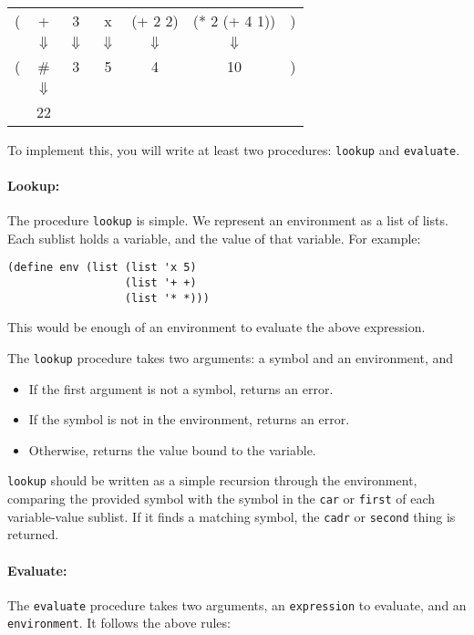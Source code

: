 \documentclass[letterpaper,12pt]{article}
\begin{document}
\begin{multicols}{2}
\begin{enumerate}
  {\hspace{-\leftmargin}
    \footnotesize \tt 
    \begin{tabular}{c@{}c@{\;}c@{\;}c@{\;}c@{\;}c@{}c}
      ( & + & 3 & x & (+ 2 2) & (* 2 (+ 4 1)) & )\\
        & $\Downarrow$& $\Downarrow$& $\Downarrow$& $\Downarrow$& $\Downarrow$& \\
      ( & \#<procedure:+> & 3 & 5 & 4 & 10 & )\\
        &$\Downarrow$ \\
        &22\\
    \end{tabular}
  }
  
\end{enumerate}

To implement this, you will write at least two procedures: {\tt lookup} and
{\tt evaluate}.

\paragraph{Lookup:}
The procedure {\tt lookup} is simple.  We represent an environment as a list of
lists.  Each sublist holds a variable, and the value of that variable. For
example:
\begin{Verbatim}[frame=single]
(define env (list (list 'x 5)
                  (list '+ +)
                  (list '* *)))
\end{Verbatim}
This would be enough of an environment to evaluate the above expression.

The {\tt lookup} procedure takes two arguments: a symbol and an environment, and
\begin{itemize}\setlength{\itemsep}{0pt}
\item If the first argument is not a symbol, returns an error.
\item If the symbol is not in the environment, returns an error.
\item Otherwise, returns the value bound to the variable.
\end{itemize}
{\tt lookup} should be written as a simple recursion through the
environment, comparing the provided symbol with the symbol in the
{\tt car} or {\tt first}
of each variable-value sublist.  If it finds a matching
symbol, the {\tt cadr} or {\tt second} thing is returned.
  
\paragraph{Evaluate:}
The {\tt evaluate} procedure takes two arguments, an {\tt expression} to
evaluate, and an {\tt environment}.  It follows the above rules:
\begin{itemize}\setlength{\itemsep}{0pt}


\end{itemize}
\end{multicols}
\end{document}
